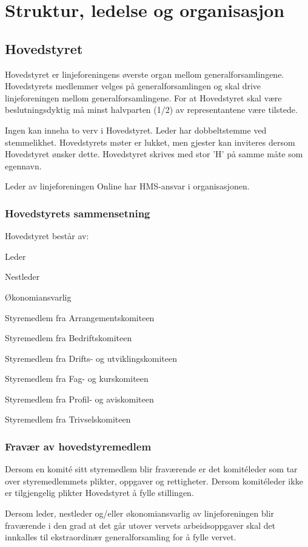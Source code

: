 \chapter{Struktur, ledelse og organisasjon}
\section{Hovedstyret}
\vspace{23pt}

Hovedstyret er linjeforeningens øverste organ mellom generalforsamlingene. Hovedstyrets medlemmer velges på generalforsamlingen og skal drive linjeforeningen mellom generalforsamlingene. For at Hovedstyret skal være beslutningsdyktig må minst halvparten (1/2) av representantene være tilstede.\newline

Ingen kan inneha to verv i Hovedstyret. Leder har dobbeltstemme ved stemmelikhet. Hovedstyrets møter er lukket, men gjester kan inviteres dersom Hovedstyret ønsker dette. Hovedstyret skrives med stor ’H’ på samme måte som egennavn.

Leder av linjeforeningen Online har HMS-ansvar i organisasjonen.


\subsection{Hovedstyrets sammensetning}{
Hovedstyret består av:
\begin{liste}
	\item Leder
	\item Nestleder
	\item Økonomiansvarlig
	\item Styremedlem fra Arrangementskomiteen
	\item Styremedlem fra Bedriftskomiteen
	\item Styremedlem fra Drifts- og utviklingskomiteen
	\item Styremedlem fra Fag- og kurskomiteen
	\item Styremedlem fra Profil- og aviskomiteen
	\item Styremedlem fra Trivselskomiteen
\end{liste}
}


\subsection{Fravær av hovedstyremedlem}{
Dersom en komité sitt styremedlem blir fraværende er det komitéleder som tar over styremedlemmets plikter, oppgaver og rettigheter. Dersom komitéleder ikke er tilgjengelig plikter Hovedstyret å fylle stillingen.

Dersom leder, nestleder og/eller økonomiansvarlig av linjeforeningen blir fraværende i den grad at det går utover vervets arbeidsoppgaver skal det innkalles til ekstraordinær generalforsamling for å fylle vervet.
}

